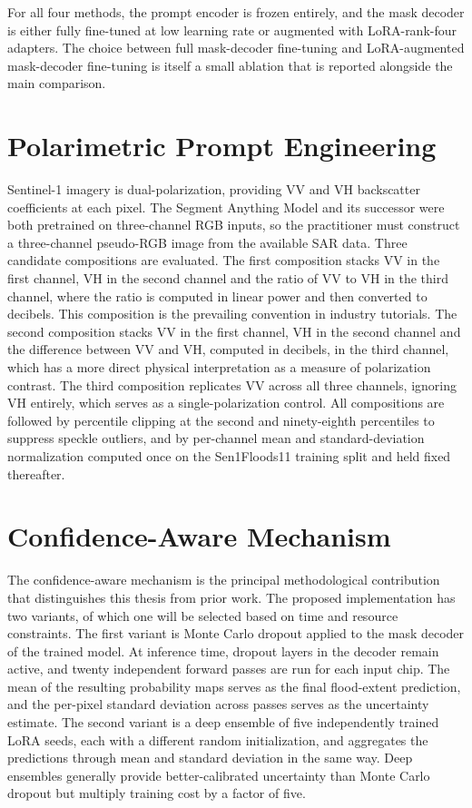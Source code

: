 \documentclass[11pt,a4paper,oneside]{report}
\begin{document}
For all four methods, the prompt encoder is frozen entirely, and the mask decoder is either fully fine-tuned at low learning rate or augmented with LoRA-rank-four adapters. The choice between full mask-decoder fine-tuning and LoRA-augmented mask-decoder fine-tuning is itself a small ablation that is reported alongside the main comparison.

\section{Polarimetric Prompt Engineering}

Sentinel-1 imagery is dual-polarization, providing VV and VH backscatter coefficients at each pixel. The Segment Anything Model and its successor were both pretrained on three-channel RGB inputs, so the practitioner must construct a three-channel pseudo-RGB image from the available SAR data. Three candidate compositions are evaluated. The first composition stacks VV in the first channel, VH in the second channel and the ratio of VV to VH in the third channel, where the ratio is computed in linear power and then converted to decibels. This composition is the prevailing convention in industry tutorials. The second composition stacks VV in the first channel, VH in the second channel and the difference between VV and VH, computed in decibels, in the third channel, which has a more direct physical interpretation as a measure of polarization contrast. The third composition replicates VV across all three channels, ignoring VH entirely, which serves as a single-polarization control. All compositions are followed by percentile clipping at the second and ninety-eighth percentiles to suppress speckle outliers, and by per-channel mean and standard-deviation normalization computed once on the Sen1Floods11 training split and held fixed thereafter.

\section{Confidence-Aware Mechanism}

The confidence-aware mechanism is the principal methodological contribution that distinguishes this thesis from prior work. The proposed implementation has two variants, of which one will be selected based on time and resource constraints. The first variant is Monte Carlo dropout applied to the mask decoder of the trained model. At inference time, dropout layers in the decoder remain active, and twenty independent forward passes are run for each input chip. The mean of the resulting probability maps serves as the final flood-extent prediction, and the per-pixel standard deviation across passes serves as the uncertainty estimate. The second variant is a deep ensemble of five independently trained LoRA seeds, each with a different random initialization, and aggregates the predictions through mean and standard deviation in the same way. Deep ensembles generally provide better-calibrated uncertainty than Monte Carlo dropout but multiply training cost by a factor of five.
\end{document}
